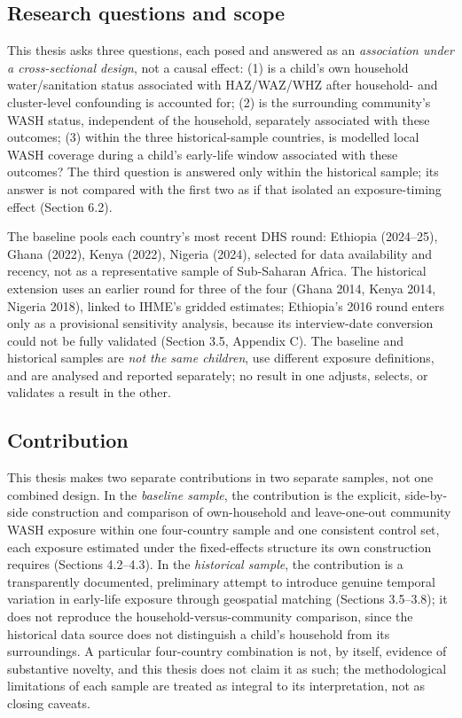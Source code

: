 \subsection{Research questions and scope}\label{sec:1.3}

This thesis asks three questions, each posed and answered as an \emph{association under a cross-sectional design}, not a causal effect: (1) is a child's own household water/sanitation status associated with HAZ/WAZ/WHZ after household- and cluster-level confounding is accounted for; (2) is the surrounding community's WASH status, independent of the household, separately associated with these outcomes; (3) within the three historical-sample countries, is modelled local WASH coverage during a child's early-life window associated with these outcomes? The third question is answered only within the historical sample; its answer is not compared with the first two as if that isolated an exposure-timing effect (Section 6.2).

The baseline pools each country's most recent DHS round: Ethiopia (2024--25), Ghana (2022), Kenya (2022), Nigeria (2024), selected for data availability and recency, not as a representative sample of Sub-Saharan Africa. The historical extension uses an earlier round for three of the four (Ghana 2014, Kenya 2014, Nigeria 2018), linked to IHME's gridded estimates; Ethiopia's 2016 round enters only as a provisional sensitivity analysis, because its interview-date conversion could not be fully validated (Section 3.5, Appendix C). The baseline and historical samples are \emph{not the same children}, use different exposure definitions, and are analysed and reported separately; no result in one adjusts, selects, or validates a result in the other.

\subsection{Contribution}\label{sec:1.4}

This thesis makes two separate contributions in two separate samples, not one combined design. In the \emph{baseline sample}, the contribution is the explicit, side-by-side construction and comparison of own-household and leave-one-out community WASH exposure within one four-country sample and one consistent control set, each exposure estimated under the fixed-effects structure its own construction requires (Sections 4.2--4.3). In the \emph{historical sample}, the contribution is a transparently documented, preliminary attempt to introduce genuine temporal variation in early-life exposure through geospatial matching (Sections 3.5--3.8); it does not reproduce the household-versus-community comparison, since the historical data source does not distinguish a child's household from its surroundings. A particular four-country combination is not, by itself, evidence of substantive novelty, and this thesis does not claim it as such; the methodological limitations of each sample are treated as integral to its interpretation, not as closing caveats.

